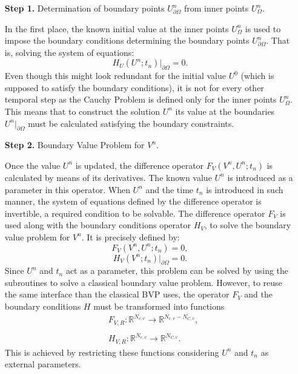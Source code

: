  \begin{enumerate}      
    \item[\textbf{Step 1.}]   Determination of boundary points $U^n_{ \partial \Omega}$  from inner points $U^n_{\Omega}$.
       
        In the first place, the known initial value at the inner points $U^n_{\Omega}$ is used to impose the boundary conditions determining the boundary points $U^n_{ \partial \Omega}$. That is, solving the system of equations:
        \begin{equation*}
        	{H_U}({U}^n;t_n)\big\rvert_{\partial \Omega}=0. 
        \end{equation*}
         Even though this might look redundant for the initial value $U^0$ (which is supposed to satisfy the boundary conditions), it is not for every other temporal step as the Cauchy Problem is defined only for the inner points $U^{n}_{\Omega}$. This means that to construct the solution $U^n$ its value at the boundaries ${U}^{n}\big\rvert_{\partial \Omega}$ must be calculated satisfying the boundary constraints. 
        
    \item[\textbf{Step 2.}] Boundary Value Problem for $V^n$.
    
        Once the value  $U^n$ is updated, the difference operator ${F}_V({V}^n,U^n;t_n)$ is calculated by means of its derivatives. The known value $U^n$ is introduced as a parameter in this operator. When $U^n$ and the time $t_n$ is introduced in such manner, the system of equations defined by the difference operator is invertible, a required condition to be solvable. 
        The  difference operator  $ F_V $ is used along with the boundary conditions operator $H_V$, to solve the boundary value problem for $V^n$. It is precisely defined by:
        $$ {F}_V({V}^n,U^n;t_n)=0, $$
        $$ H_V({V}^n;t_n)\big\rvert_{\partial \Omega}= 0. $$
        Since  $U^n$ and $t_n$ act as a parameter, this problem can be solved by using the subroutines to solve a classical  boundary value problem. However, to reuse the same interface than  the classical BVP uses,  the operator $F_V$ and the boundary conditions $H$ must be transformed into functions 
        \begin{align*}
             & {F}_{V,R}: \mathbb{ R}^{N_{e,v}} \rightarrow \mathbb{ R}^{N_{e,v}-N_{C,v}}, \\ \\
             & {H}_{V,R}: \mathbb{ R}^{N_{e,v}} \rightarrow \mathbb{ R}^{N_{C,v}}.
        \end{align*}  
        This is achieved by restricting these functions considering  $U^n$ and $t_n$ as external parameters. 
        

\end{enumerate}

